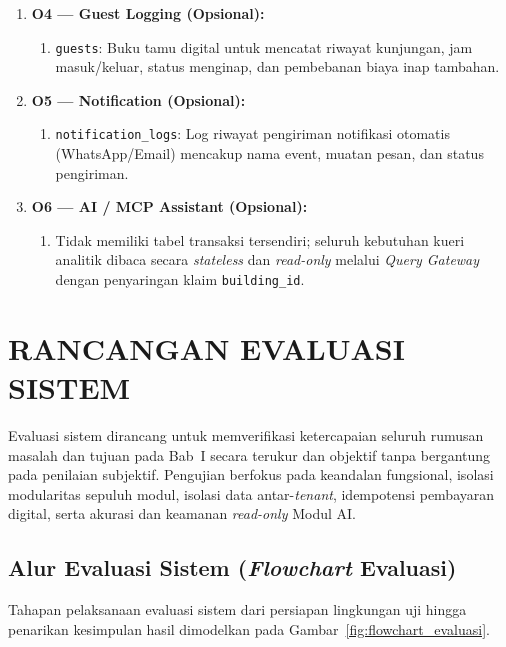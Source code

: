 \begin{enumerate}[label=\arabic*., leftmargin=*]
  \item \textbf{O4 --- Guest Logging (Opsional):}
    \begin{enumerate}[label=\alph*., leftmargin=*]
      \item \texttt{guests}: Buku tamu digital untuk mencatat riwayat kunjungan, jam masuk/keluar, status menginap, dan pembebanan biaya inap tambahan.
    \end{enumerate}
  \item \textbf{O5 --- Notification (Opsional):}
    \begin{enumerate}[label=\alph*., leftmargin=*]
      \item \texttt{notification\_logs}: Log riwayat pengiriman notifikasi otomatis (WhatsApp/Email) mencakup nama event, muatan pesan, dan status pengiriman.
    \end{enumerate}
  \item \textbf{O6 --- AI / MCP Assistant (Opsional):}
    \begin{enumerate}[label=\alph*., leftmargin=*]
      \item Tidak memiliki tabel transaksi tersendiri; seluruh kebutuhan kueri analitik dibaca secara \textit{stateless} dan \textit{read-only} melalui \textit{Query Gateway} dengan penyaringan klaim \texttt{building\_id}.
    \end{enumerate}
\end{enumerate}

\section{RANCANGAN EVALUASI SISTEM}
\label{sec:rancangan_evaluasi}

Evaluasi sistem dirancang untuk memverifikasi ketercapaian seluruh rumusan masalah dan tujuan pada Bab~I secara terukur dan objektif tanpa bergantung pada penilaian subjektif. Pengujian berfokus pada keandalan fungsional, isolasi modularitas sepuluh modul, isolasi data antar-\textit{tenant}, idempotensi pembayaran digital, serta akurasi dan keamanan \textit{read-only} Modul AI.

\subsection{Alur Evaluasi Sistem (\textit{Flowchart} Evaluasi)}

Tahapan pelaksanaan evaluasi sistem dari persiapan lingkungan uji hingga penarikan kesimpulan hasil dimodelkan pada Gambar~\ref{fig:flowchart_evaluasi}.

